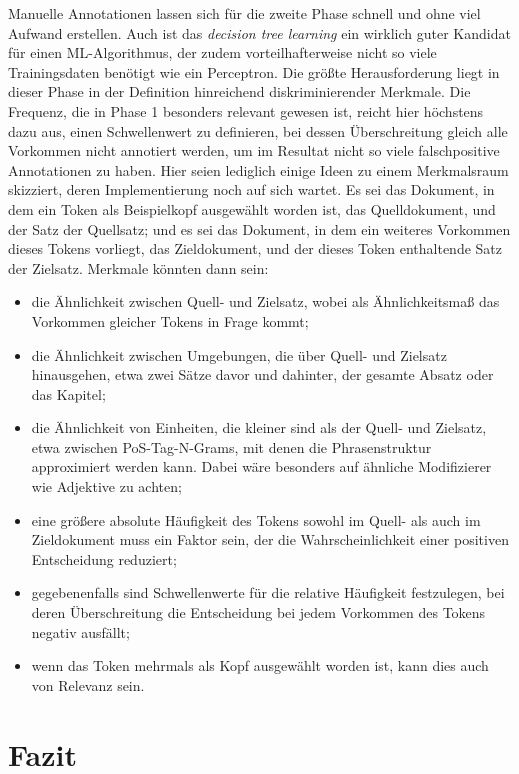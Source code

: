 \documentclass{article}
\newcommand*{\englisch}[1]{\foreignlanguage{english}{\textit{#1}}}%
\begin{document}
Manuelle Annotationen lassen sich für die zweite Phase schnell und
ohne viel Aufwand erstellen. Auch ist das \englisch{decision tree
  learning} ein wirklich guter Kandidat für einen ML-Algorithmus, der
zudem vorteilhafterweise nicht so viele Trainingsdaten benötigt wie
ein Perceptron. Die größte Herausforderung liegt in dieser Phase in
der Definition hinreichend diskriminierender Merkmale. Die Frequenz,
die in Phase 1 besonders relevant gewesen ist, reicht hier höchstens
dazu aus, einen Schwellenwert zu definieren, bei dessen Überschreitung
gleich alle Vorkommen nicht annotiert werden, um im Resultat nicht so
viele falschpositive Annotationen zu haben. Hier seien lediglich
einige Ideen zu einem Merkmalsraum skizziert, deren Implementierung
noch auf sich wartet. Es sei das Dokument, in dem ein Token als
Beispielkopf ausgewählt worden ist, das Quelldokument, und der Satz
der Quellsatz; und es sei das Dokument, in dem ein weiteres Vorkommen
dieses Tokens vorliegt, das Zieldokument, und der dieses Token
enthaltende Satz der Zielsatz. Merkmale könnten dann sein:
\begin{itemize}
\item die Ähnlichkeit zwischen Quell- und Zielsatz, wobei als
  Ähnlichkeitsmaß das Vorkommen gleicher Tokens in Frage kommt;
\item die Ähnlichkeit zwischen Umgebungen, die über Quell- und
  Zielsatz hinausgehen, etwa zwei Sätze davor und dahinter, der
  gesamte Absatz oder das Kapitel;
\item die Ähnlichkeit von Einheiten, die kleiner sind als der Quell-
  und Zielsatz, etwa zwischen PoS-Tag-N-Grams, mit denen die
  Phrasenstruktur approximiert werden kann. Dabei wäre besonders auf
  ähnliche Modifizierer wie Adjektive zu achten;
\item eine größere absolute Häufigkeit des Tokens sowohl im Quell- als
  auch im Zieldokument muss ein Faktor sein, der die
  Wahrscheinlichkeit einer positiven Entscheidung reduziert;
\item gegebenenfalls sind Schwellenwerte für die relative Häufigkeit
  festzulegen, bei deren Überschreitung die Entscheidung bei jedem
  Vorkommen des Tokens negativ ausfällt;
\item wenn das Token mehrmals als Kopf ausgewählt worden ist, kann
  dies auch von Relevanz sein.
\end{itemize}

\section{Fazit}
\end{document}
